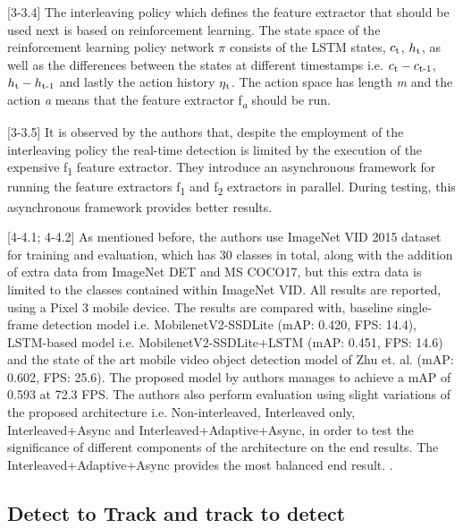 \documentclass[conference]{IEEEtran}
\begin{document}
[3-3.4] The interleaving policy which defines the feature extractor that should be used next is based on reinforcement learning. The state space of the reinforcement learning policy network $\pi$ consists of the LSTM states, $c\textsubscript{t}$, $h\textsubscript{t}$, as well as the differences between the states at different timestamps i.e. $c\textsubscript{t}-c\textsubscript{t-1}$, $h\textsubscript{t}-h\textsubscript{t-1}$ and lastly the action history $\eta\textsubscript{t}$. The action space has length \textit{m} and the action \textit{a} means that the feature extractor f\textsubscript{\textit{a}} should be run. \newline

[3-3.5] It is observed by the authors that, despite the employment of the interleaving policy the real-time detection is limited by the execution of the expensive f\textsubscript{1} feature extractor. They introduce an asynchronous framework for running the feature extractors f\textsubscript{1} and f\textsubscript{2} extractors in parallel. During testing, this asynchronous framework provides better results. \newline

[4-4.1; 4-4.2] As mentioned before, the authors use ImageNet VID 2015 dataset for training and evaluation, which has 30 classes in total, along with the addition of extra data from ImageNet DET and MS COCO17, but this extra data is limited to the classes contained within ImageNet VID. All results are reported, using a Pixel 3 mobile device. The results are compared with, baseline single-frame detection model i.e. MobilenetV2-SSDLite (mAP: 0.420, FPS: 14.4), LSTM-based model i.e. MobilenetV2-SSDLite+LSTM (mAP: 0.451, FPS: 14.6) and the state of the art mobile video object detection model of Zhu et. al. (mAP: 0.602, FPS: 25.6). The proposed model by authors manages to achieve a mAP of 0.593 at 72.3 FPS. The authors also perform evaluation using slight variations of the proposed architecture i.e. Non-interleaved, Interleaved only, Interleaved+Async and Interleaved+Adaptive+Async, in order to test the significance of different components of the architecture on the end results. The Interleaved+Adaptive+Async provides the most balanced end result. \cite{b37}.

\subsection{Detect to Track and track to detect\cite{b8}}
\end{document}
